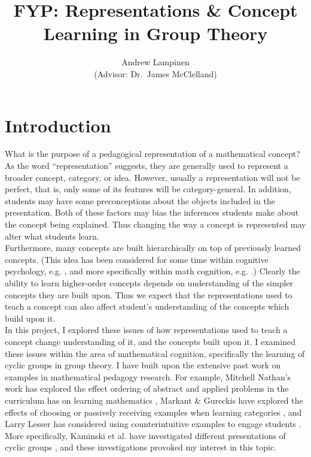 \documentclass[11pt]{article}
\begin{document}
\title{FYP: Representations \& Concept Learning in Group Theory}
\author{Andrew Lampinen \\ (Advisor: Dr.\ James McClelland)}
\date{}
\maketitle
\section{Introduction}
What is the purpose of a pedagogical representation of a mathematical concept? As the word ``representation'' suggests, they are generally used to represent a broader concept, category, or idea. However, usually a representation will not be perfect, that is, only some of its features will be category-general. In addition, students may have some preconceptions about the objects included in the presentation. Both of these factors may bias the inferences students make about the concept being explained. Thus changing the way a concept is represented may alter what students learn. \\[11pt]
Furthermore, many concepts are built hierarchically on top of previously learned concepts. (This idea has been considered for some time within cognitive psychology, e.g. \cite{Fischer1980}, and more specifically within math cognition, e.g. \cite{Hazzan1999}.) Clearly the ability to learn higher-order concepts depends on understanding of the simpler concepts they are built upon. Thus we expect that the representations used to teach a concept can also affect student's understanding of the concepts which build upon it.\\[11pt]
In this project, I explored these issues of how representations used to teach a concept change understanding of it, and the concepts built upon it. I examined these issues within the area of mathematical cognition, specifically the learning of cyclic groups in group theory. I have built upon the extensive past work on examples in mathematical pedagogy research. For example, Mitchell Nathan's work has explored the effect ordering of abstract and applied problems in the curriculum has on learning mathematics \cite{Nathan2012}, Markant \& Gureckis have explored the effects of choosing or passively receiving examples when learning categories \cite{Markant2014}, and Larry Lesser has considered using counterintuitive examples to engage students \cite{Lesser1998}. More specifically, Kaminski et al. have investigated different presentations of cyclic groups \cite{Kaminski2008}, and these investigations provoked my interest in this topic. 
\end{document}
